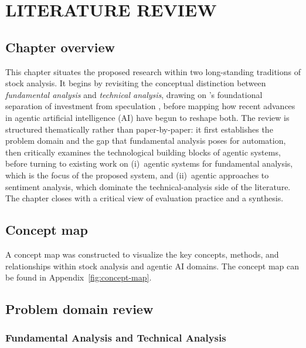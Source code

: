 \chapter{LITERATURE REVIEW}
\section{Chapter overview}

This chapter situates the proposed research within two long-standing
traditions of stock analysis. It begins by revisiting the conceptual
distinction between \emph{fundamental analysis} and \emph{technical
analysis}, drawing on \citeauthor{Graham2006}'s foundational separation
of investment from speculation \citep{Graham2006}, before mapping how
recent advances in agentic artificial intelligence (AI) have begun to
reshape both. The review is structured thematically rather than
paper-by-paper: it first establishes the problem domain and the gap
that fundamental analysis poses for automation, then critically examines
the technological building blocks of agentic systems, before turning to
existing work on (i)~agentic systems for fundamental analysis, which
is the focus of the proposed system, and (ii)~agentic approaches to
sentiment analysis, which dominate the technical-analysis side of the
literature. The chapter closes with a critical view of evaluation
practice and a synthesis.

\section{Concept map}
A concept map was constructed to visualize the key concepts, methods, and relationships within stock analysis and agentic AI domains. The concept map can be found in Appendix~\ref{fig:concept-map}.

\section{Problem domain review}

\subsection{Fundamental Analysis and Technical Analysis}
\label{sec:twotraditions}

